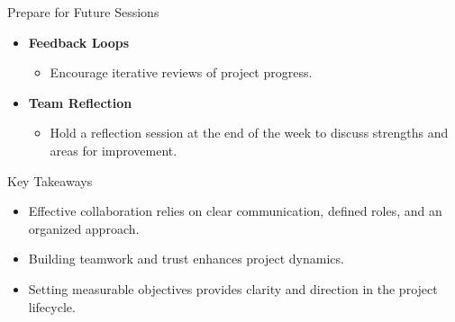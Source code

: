 \documentclass[aspectratio=169]{beamer}
\begin{document}
\begin{frame}[fragile]{Prepare for Future Sessions}
    \begin{itemize}
        \item \textbf{Feedback Loops}
            \begin{itemize}
                \item Encourage iterative reviews of project progress.
            \end{itemize}
        
        \item \textbf{Team Reflection}
            \begin{itemize}
                \item Hold a reflection session at the end of the week to discuss strengths and areas for improvement.
            \end{itemize}
    \end{itemize}
\end{frame}

\begin{frame}[fragile]{Key Takeaways}
    \begin{itemize}
        \item Effective collaboration relies on clear communication, defined roles, and an organized approach.
        \item Building teamwork and trust enhances project dynamics.
        \item Setting measurable objectives provides clarity and direction in the project lifecycle.
    \end{itemize}
\end{frame}
\end{document}
